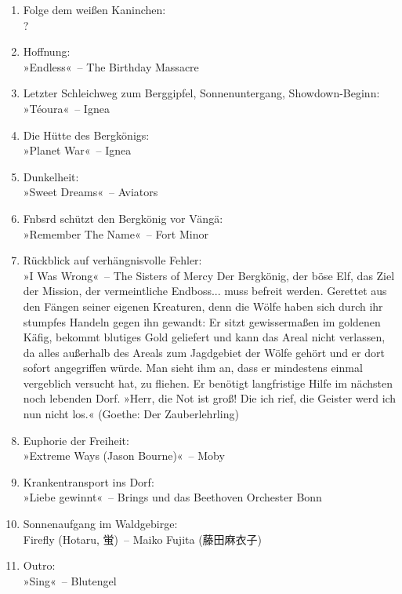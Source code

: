 \begin{enumerate}
    \item Folge dem weißen Kaninchen:\\ ?
    \item Hoffnung:\\ »Endless«~– The Birthday Massacre

    \item Letzter Schleichweg zum Berggipfel, Sonnenuntergang, Showdown-Beginn:\\ »Téoura«~– Ignea
    \item Die Hütte des Bergkönigs:\\ »Planet War«~– Ignea
    \item Dunkelheit:\\ »Sweet Dreams«~– Aviators
    \item Fnbsrd schützt den Bergkönig vor Vängä:\\ »Remember The Name«~– Fort Minor



    \item Rückblick auf verhängnisvolle Fehler:\\ »I Was Wrong«~– The Sisters of Mercy
    Der Bergkönig, der böse Elf, das Ziel der Mission, der vermeintliche Endboss... muss befreit werden. Gerettet aus den Fängen seiner eigenen Kreaturen, denn die Wölfe haben sich durch ihr stumpfes Handeln gegen ihn gewandt: Er sitzt gewissermaßen im goldenen Käfig, bekommt blutiges Gold geliefert und kann das Areal nicht verlassen, da alles außerhalb des Areals zum Jagdgebiet der Wölfe gehört und er dort sofort angegriffen würde. Man sieht ihm an, dass er mindestens einmal vergeblich versucht hat, zu fliehen. Er benötigt langfristige Hilfe im nächsten noch lebenden Dorf.
    »Herr, die Not ist groß!
    Die ich rief, die Geister
    werd ich nun nicht los.« (Goethe: Der Zauberlehrling)
    \item Euphorie der Freiheit:\\ »Extreme Ways (Jason Bourne)«~– Moby
    \item Krankentransport ins Dorf:\\ »Liebe gewinnt«~– Brings und das Beethoven Orchester Bonn
    \item Sonnenaufgang im Waldgebirge:\\ Firefly (Hotaru, 蛍)~– Maiko Fujita (藤田麻衣子)
    \item Outro:\\ »Sing«~– Blutengel

\end{enumerate}



